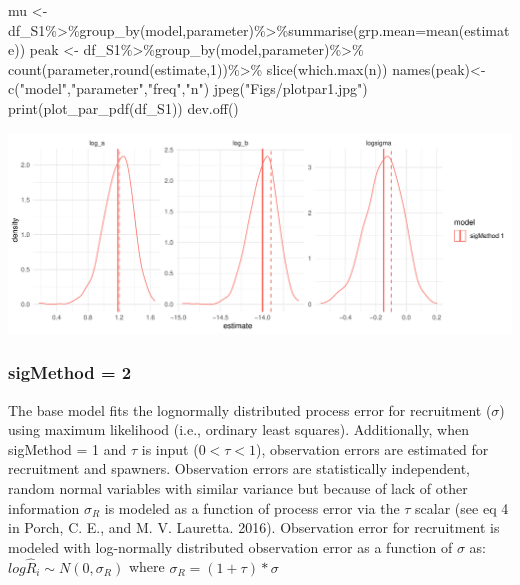 \documentclass[
]{article}
\newenvironment{Shaded}{\begin{snugshade}}{\end{snugshade}}
\newcommand{\AttributeTok}[1]{\textcolor[rgb]{0.77,0.63,0.00}{#1}}
\newcommand{\DecValTok}[1]{\textcolor[rgb]{0.00,0.00,0.81}{#1}}
\newcommand{\FunctionTok}[1]{\textcolor[rgb]{0.00,0.00,0.00}{#1}}
\newcommand{\NormalTok}[1]{#1}
\newcommand{\OtherTok}[1]{\textcolor[rgb]{0.56,0.35,0.01}{#1}}
\newcommand{\SpecialCharTok}[1]{\textcolor[rgb]{0.00,0.00,0.00}{#1}}
\newcommand{\StringTok}[1]{\textcolor[rgb]{0.31,0.60,0.02}{#1}}
\begin{document}
\begin{Shaded}
\begin{Highlighting}[]
\NormalTok{  mu   }\OtherTok{\textless{}{-}}\NormalTok{ df\_S1}\SpecialCharTok{\%\textgreater{}\%}\FunctionTok{group\_by}\NormalTok{(model,parameter)}\SpecialCharTok{\%\textgreater{}\%}\FunctionTok{summarise}\NormalTok{(}\AttributeTok{grp.mean=}\FunctionTok{mean}\NormalTok{(estimate))}
\NormalTok{  peak }\OtherTok{\textless{}{-}}\NormalTok{ df\_S1}\SpecialCharTok{\%\textgreater{}\%}\FunctionTok{group\_by}\NormalTok{(model,parameter)}\SpecialCharTok{\%\textgreater{}\%}
    \FunctionTok{count}\NormalTok{(parameter,}\FunctionTok{round}\NormalTok{(estimate,}\DecValTok{1}\NormalTok{))}\SpecialCharTok{\%\textgreater{}\%}
    \FunctionTok{slice}\NormalTok{(}\FunctionTok{which.max}\NormalTok{(n))}
  \FunctionTok{names}\NormalTok{(peak)}\OtherTok{\textless{}{-}} \FunctionTok{c}\NormalTok{(}\StringTok{"model"}\NormalTok{,}\StringTok{"parameter"}\NormalTok{,}\StringTok{"freq"}\NormalTok{,}\StringTok{"n"}\NormalTok{)}
 \FunctionTok{jpeg}\NormalTok{(}\StringTok{"Figs/plotpar1.jpg"}\NormalTok{)}
 \FunctionTok{print}\NormalTok{(}\FunctionTok{plot\_par\_pdf}\NormalTok{(df\_S1))}
 \FunctionTok{dev.off}\NormalTok{()}
\end{Highlighting}
\end{Shaded}

\includegraphics{futR_demo_files/figure-latex/plot1-1.pdf}

\hypertarget{sigmethod-2-1}{%
\subsubsection{sigMethod = 2}\label{sigmethod-2-1}}

The base model fits the lognormally distributed process error for
recruitment (\(\sigma\)) using maximum likelihood (i.e., ordinary least
squares). Additionally, when sigMethod = 1 and \(\tau\) is input
(\(0<\tau<1\)), observation errors are estimated for recruitment and
spawners. Observation errors are statistically independent, random
normal variables with similar variance but because of lack of other
information \(\sigma_R\) is modeled as a function of process error via
the \(\tau\) scalar (see eq 4 in Porch, C. E., and M. V. Lauretta.
2016). Observation error for recruitment is modeled with log-normally
distributed observation error as a function of \(\sigma\) as:
\(log\hat{R}_i\sim N(0,\sigma_R)\) where \(\sigma_R=(1+\tau)*\sigma\)
\end{document}
